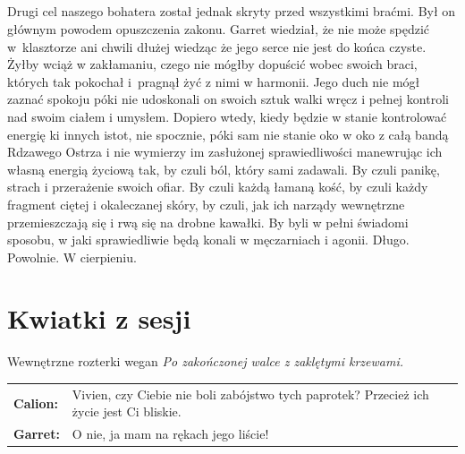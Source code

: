 \documentclass[10pt,twoside,twocolumn]{book}
\begin{document}
\paragraph{}
Drugi cel naszego bohatera został jednak skryty przed wszystkimi braćmi.
Był on głównym powodem opuszczenia zakonu.
Garret wiedział, że nie może spędzić w klasztorze ani chwili dłużej wiedząc że jego serce nie jest do końca czyste.
Żyłby wciąż w zakłamaniu, czego nie mógłby dopuścić wobec swoich braci, których tak pokochał i pragnął żyć z nimi w harmonii.
Jego duch nie mógł zaznać spokoju póki nie udoskonali on swoich sztuk walki wręcz i pełnej kontroli nad swoim ciałem i umysłem.
Dopiero wtedy, kiedy będzie w stanie kontrolować energię ki innych istot, nie spocznie, póki sam nie stanie oko w oko z całą bandą Rdzawego Ostrza i nie wymierzy im zasłużonej sprawiedliwości manewrując ich własną energią życiową tak, by czuli ból, który sami zadawali.
By czuli panikę, strach i przerażenie swoich ofiar.
By czuli każdą łamaną kość, by czuli każdy fragment ciętej i okaleczanej skóry, by czuli, jak ich narządy wewnętrzne przemieszczają się i rwą się na drobne kawałki.
By byli w pełni świadomi sposobu, w jaki sprawiedliwie będą konali w męczarniach i agonii.
Długo.
Powolnie.
W cierpieniu.

\twocolumn
\normalsize
\chapter{Kwiatki z sesji}

% 
% 


\begin{rpg-quotebox}{Wewnętrzne rozterki wegan}
   \textit{Po zakończonej walce z zaklętymi krzewami.}\\
   
   \begin{tabularx}{\columnwidth}{lX}
      \textbf{Calion:} & Vivien, czy Ciebie nie boli zabójstwo tych paprotek? Przecież ich życie jest Ci bliskie.\\
      \textbf{Garret:} & O nie, ja mam na rękach jego liście!
   \end{tabularx}
\end{rpg-quotebox}
\end{document}
